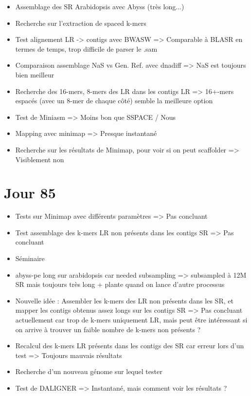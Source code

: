 \documentclass[12pt]{report}
\begin{document}
\begin{itemize}
	\item Assemblage des SR Arabidopsis avec Abyss (très long...)
	
	\item Recherche sur l'extraction de spaced k-mers
	
	\item Test alignement LR -> contigs avec BWASW => Comparable à BLASR en termes de temps, trop difficile de parser le .sam
	
	\item Comparaison assemblage NaS vs Gen. Ref. avec dnadiff => NaS est toujours bien meilleur
	
	\item Recherche des 16-mers, 8-mers des LR dans les contigs LR => 16+-mers espacés (avec un 8-mer de chaque côté) semble la meilleure option
	
	\item Test de Miniasm => Moins bon que SSPACE / Nous
	
	\item Mapping avec minimap => Presque instantané 
	
	\item Recherche sur les résultats de Minimap, pour voir si on peut scaffolder => Visiblement non
\end{itemize}

\section{Jour 85}

\begin{itemize}	
	\item Tests sur Minimap avec différents paramètres => Pas concluant

	\item Test assemblage des k-mers LR non présents dans les contigs SR => Pas concluant
	
	\item Séminaire
	
	\item abyss-pe long sur arabidopsis car needed subsampling => subsampled à 12M SR mais toujours très long + plante quand on lance d'autre processus
	
	\item Nouvelle idée : Assembler les k-mers des LR non présents dans les SR, et mapper les contigs obtenus assez longs sur les contigs SR
		  => Pas concluant actuellement car trop de k-mers uniquement LR,
		  mais peut être intéressant si on arrive à trouver un faible nombre de k-mers non présents ?
	
	\item Recalcul des k-mers LR présents dans les contigs des SR car erreur lors d'un test => Toujours mauvais résultats
	
	\item Recherche d'un nouveau génome sur lequel tester
	
	\item Test de DALIGNER => Instantané, mais comment voir les résultats ?
\end{itemize}
\end{document}
